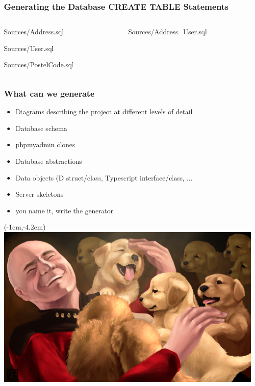 \documentclass[xelatex,13pt]{beamer}
\begin{document}
\begin{frame}
	\frametitle{Generating the Database CREATE TABLE Statements}
	\begin{columns}[T]
		\begin{column}{0.49\linewidth}
	
		{Sources/Address.sql}
	
			{Sources/User.sql}
	
			{Sources/PostelCode.sql}
		\end{column}
		\begin{column}{0.49\linewidth}
	
			{Sources/Address_User.sql}
		\end{column}
		
	\end{columns}
\end{frame}

\begin{frame}
	\frametitle{What can we generate}
	\begin{itemize}
		\item Diagrams describing the project at different levels of detail
		\item Database schema
		\item phpmyadmin clones
		\item Database abstractions
		\item Data objects (D struct/class, Typescript interface/class, \(\dots\)
		\item Server skeletons
			\pause
		\item you name it\pause, write the generator
	\end{itemize}
\end{frame}

\begin{frame}[plain]
\begin{textblock*}{0cm}(-1cm,-4.2cm)
	\includegraphics[width=1.0\paperwidth]{picardpuppy.png}
\end{textblock*}
\end{frame}
\end{document}

